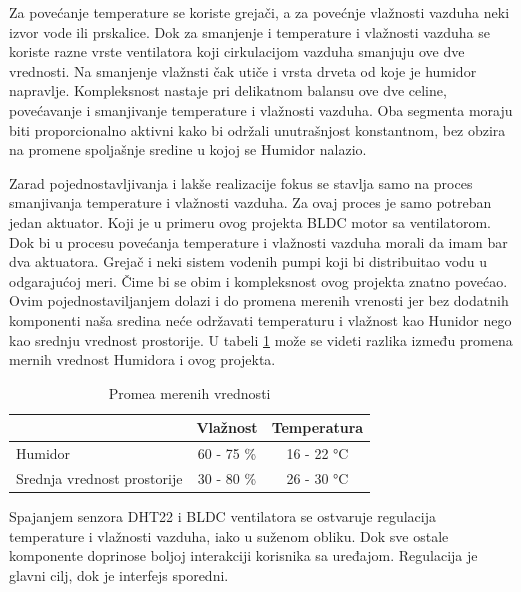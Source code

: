 \documentclass[a4paper, 12pt]{article}
\begin{document}
\vspace{10pt}

Za povećanje temperature se koriste grejači, a za povećnje vlažnosti vazduha neki izvor vode ili prskalice. Dok za smanjenje i temperature i vlažnosti vazduha se koriste razne vrste ventilatora koji cirkulacijom vazduha smanjuju ove dve vrednosti. Na smanjenje vlažnsti čak utiče i vrsta drveta od koje je humidor napravlje. Kompleksnost nastaje pri delikatnom balansu ove dve celine, povećavanje i smanjivanje temperature i vlažnosti vazduha. Oba segmenta moraju biti proporcionalno aktivni kako bi održali unutrašnjost konstantnom, bez obzira na promene spoljašnje sredine u kojoj se Humidor nalazio.

\vspace{10pt}

\sloppypar
Zarad pojednostavljivanja i lakše realizacije fokus se stavlja samo na proces smanjivanja temperature i vlažnosti vazduha. Za ovaj proces je samo potreban jedan aktuator. Koji je u primeru ovog projekta BLDC motor sa ventilatorom. Dok bi u procesu povećanja temperature i vlažnosti vazduha morali da imam bar dva aktuatora. Grejač i neki sistem vodenih pumpi koji bi distribuitao vodu u odgarajućoj meri. Čime bi se obim i kompleksnost ovog projekta znatno povećao. Ovim pojednostaviljanjem dolazi i do promena merenih vrenosti jer bez dodatnih komponenti naša sredina neće održavati temperaturu i vlažnost kao Hunidor nego kao srednju vrednost prostorije. U tabeli \ref{tab:merne-vrednosti} može se videti razlika između promena mernih vrednost Humidora i ovog projekta.

\vspace{10pt}

\begin{table}[H]
\centering
\begin{tabular}{|l|c|c|}
\hline
& Vlažnost & Temperatura\\
\hline
Humidor & 60 - 75 \% & 16 - 22 °C\\
\hline
Srednja vrednost prostorije & 30 - 80 \% & 26 - 30 °C\\
\hline
\end{tabular}
\caption{Promea merenih vrednosti} \label{tab:merne-vrednosti}
\end{table}

Spajanjem senzora DHT22 i BLDC ventilatora se ostvaruje regulacija temperature i vlažnosti vazduha, iako u suženom obliku. Dok sve ostale komponente doprinose boljoj interakciji korisnika sa uređajom. Regulacija je glavni cilj, dok je interfejs sporedni.
\end{document}
